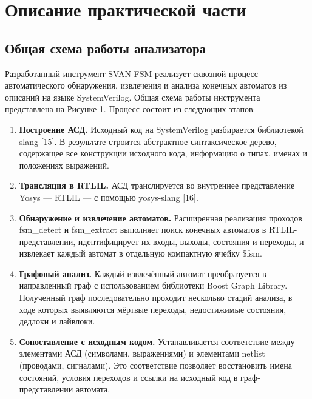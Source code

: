 \section{Описание практической части}
\label{sec:Chapter4} 

\subsection{Общая схема работы анализатора}

Разработанный инструмент SVAN-FSM реализует сквозной процесс автоматического обнаружения, извлечения и анализа конечных автоматов из описаний на языке SystemVerilog. Общая схема работы инструмента представлена на Рисунке 1. Процесс состоит из следующих этапов:

\begin{enumerate}
\item \textbf{Построение АСД.} Исходный код на SystemVerilog разбирается библиотекой slang [15].
В результате строится абстрактное синтаксическое дерево, содержащее все конструкции исходного кода,
информацию о типах, именах и положениях выражений.

\item \textbf{Трансляция в RTLIL.} АСД транслируется во внутреннее представление Yosys --- RTLIL ---
с помощью yosys-slang [16].

\item \textbf{Обнаружение и извлечение автоматов.} Расширенная реализация проходов fsm\_detect
и fsm\_extract выполняет поиск конечных автоматов в RTLIL-представлении, идентифицирует их входы,
выходы, состояния и переходы, и извлекает каждый автомат в отдельную компактную ячейку \$fsm.

\item \textbf{Графовый анализ.} Каждый извлечённый автомат преобразуется в направленный граф
с использованием библиотеки Boost Graph Library. Полученный граф последовательно проходит
несколько стадий анализа, в ходе которых выявляются мёртвые переходы, недостижимые состояния,
дедлоки и лайвлоки.

\item \textbf{Сопоставление с исходным кодом.} Устанавливается соответствие между элементами АСД
(символами, выражениями) и элементами netlist (проводами, сигналами). Это соответствие позволяет
восстановить имена состояний, условия переходов и ссылки на исходный код в граф-представлении
автомата.
\end{enumerate}

